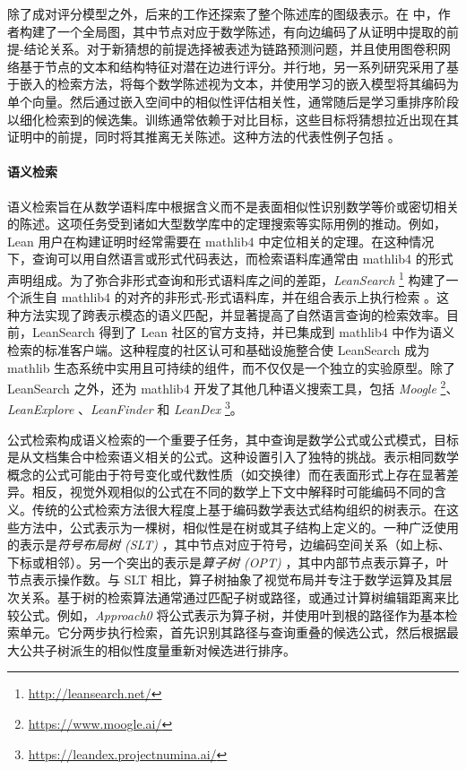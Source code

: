 \documentclass[11pt]{article}
\numberwithin{equation}{section}
\begin{document}
除了成对评分模型之外，后来的工作还探索了整个陈述库的图级表示。在 \cite{ferreira-freitas-2020-premise} 中，作者构建了一个全局图，其中节点对应于数学陈述，有向边编码了从证明中提取的前提-结论关系。对于新猜想的前提选择被表述为链路预测问题，并且使用图卷积网络基于节点的文本和结构特征对潜在边进行评分。并行地，另一系列研究采用了基于嵌入的检索方法，将每个数学陈述视为文本，并使用学习的嵌入模型将其编码为单个向量。然后通过嵌入空间中的相似性评估相关性，通常随后是学习重排序阶段以细化检索到的候选集。训练通常依赖于对比目标，这些目标将猜想拉近出现在其证明中的前提，同时将其推离无关陈述。这种方法的代表性例子包括 \cite{yang2023leandojo,tao2025learning,shen2025real}。

\paragraph{语义检索}

语义检索旨在从数学语料库中根据含义而不是表面相似性识别数学等价或密切相关的陈述。这项任务受到诸如大型数学库中的定理搜索等实际用例的推动。例如，Lean 用户在构建证明时经常需要在 mathlib4 中定位相关的定理。在这种情况下，查询可以用自然语言或形式代码表达，而检索语料库通常由 mathlib4 的形式声明组成。为了弥合非形式查询和形式语料库之间的差距，\textit{LeanSearch} \footnote{\href{https://leansearch.net/}{http://leansearch.net/}} 构建了一个派生自 mathlib4 的对齐的非形式-形式语料库，并在组合表示上执行检索 \cite{gao-etal-2024-semantic-search}。这种方法实现了跨表示模态的语义匹配，并显著提高了自然语言查询的检索效率。目前，LeanSearch 得到了 Lean 社区的官方支持，并已集成到 mathlib4 中作为语义检索的标准客户端。这种程度的社区认可和基础设施整合使 LeanSearch 成为 mathlib 生态系统中实用且可持续的组件，而不仅仅是一个独立的实验原型。除了 LeanSearch 之外，还为 mathlib4 开发了其他几种语义搜索工具，包括 \textit{Moogle} \footnote{\href{https://www.moogle.ai/}{https://www.moogle.ai/}}、\textit{LeanExplore} \cite{asher2025leanexplore}、\textit{LeanFinder} \cite{lu2025lean} 和 \textit{LeanDex} \footnote{\href{https://leandex.projectnumina.ai/}{https://leandex.projectnumina.ai/}}。

公式检索构成语义检索的一个重要子任务，其中查询是数学公式或公式模式，目标是从文档集合中检索语义相关的公式。这种设置引入了独特的挑战。表示相同数学概念的公式可能由于符号变化或代数性质（如交换律）而在表面形式上存在显著差异。相反，视觉外观相似的公式在不同的数学上下文中解释时可能编码不同的含义。传统的公式检索方法很大程度上基于编码数学表达式结构组织的树表示。在这些方法中，公式表示为一棵树，相似性是在树或其子结构上定义的。一种广泛使用的表示是\textit{符号布局树 (SLT)} \cite{DBLP:journals/ijdar/ZanibbiB12}，其中节点对应于符号，边编码空间关系（如上标、下标或相邻）。另一个突出的表示是\textit{算子树 (OPT)} \cite{DBLP:conf/ntcir/GaoYWJT16}，其中内部节点表示算子，叶节点表示操作数。与 SLT 相比，算子树抽象了视觉布局并专注于数学运算及其层次关系。基于树的检索算法通常通过匹配子树或路径，或通过计算树编辑距离来比较公式。例如，\textit{Approach0} \cite{DBLP:conf/ecir/ZhongZ19,10.1007/978-3-030-45439-5_47} 将公式表示为算子树，并使用叶到根的路径作为基本检索单元。它分两步执行检索，首先识别其路径与查询重叠的候选公式，然后根据最大公共子树派生的相似性度量重新对候选进行排序。
\end{document}
